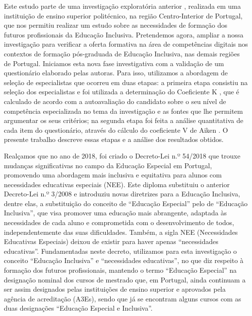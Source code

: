 \documentclass[portuguese]{textolivre}
\begin{document}
Este estudo parte de uma investigação exploratória anterior \cite{loureiro_robotica_2022}, realizada em uma instituição de ensino superior politécnico, na região Centro-Interior de Portugal, que nos permitiu realizar um estudo sobre as necessidades de formação dos futuros profissionais da Educação Inclusiva. Pretendemos agora, ampliar a nossa investigação para verificar a oferta formativa na área de competências digitais nos contextos de formação pós-graduada de Educação Inclusiva, nas demais regiões de Portugal. Iniciamos esta nova fase investigativa com a validação de um questionário elaborado pelas autoras. Para isso, utilizamos a abordagem de seleção de especialistas que ocorreu em duas etapas: a primeira etapa consistiu na seleção dos especialistas e foi utilizada a determinação do Coeficiente K \cite{cabero_almenara_utilizacion_2013,garcia_procedimiento_2008,lopez_gutierrez_establecimiento_2011,luis_desenvolvimento_2023}, que é calculado de acordo com a autoavaliação do candidato sobre o seu nível de competência especializada no tema da investigação e as fontes que lhe permitem argumentar os seus critérios; na segunda etapa foi feita a análise quantitativa de cada item do questionário, através do cálculo do coeficiente V de Aiken \cite{aiken_content_1980}. O presente trabalho descreve essas etapas e a análise dos resultados obtidos.

Realçamos que no ano de 2018, foi criado o Decreto-Lei n.º 54/2018 \cite{portugal_decreto-lei_2018} que trouxe mudanças significativas no campo da Educação Especial em Portugal, promovendo uma abordagem mais inclusiva e equitativa para alunos com necessidades educativas especiais (NEE). Este diploma substituiu o anterior Decreto-Lei n.º 3/2008 e introduziu novas diretrizes para a Educação Inclusiva, dentre elas, a substituição do conceito de “Educação Especial” pelo de “Educação Inclusiva”, que visa promover uma educação mais abrangente, adaptada às necessidades de cada aluno e comprometida com o desenvolvimento de todos, independentemente das suas dificuldades. Também, a sigla NEE (Necessidades Educativas Especiais) deixou de existir para haver apenas “necessidades educativas”. Fundamentadas neste decreto, utilizamos para esta investigação o conceito “Educação Inclusiva” e “necessidades educativas”, no que diz respeito à formação dos futuros profissionais, mantendo o termo “Educação Especial” na designação nominal dos cursos de mestrado que, em Portugal, ainda continuam a ser assim designados pelas instituições de ensino superior e aprovados pela agência de acreditação (A3Es), sendo que já se encontram alguns cursos com as duas designações “Educação Especial e Inclusiva”.
\end{document}
